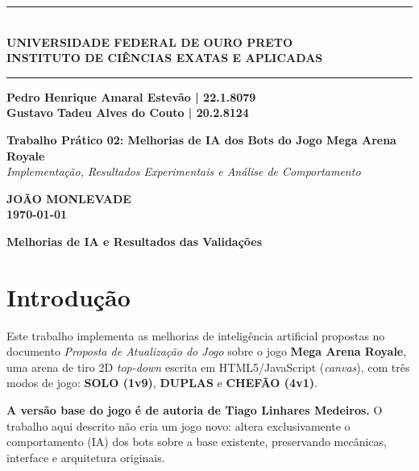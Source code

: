 \documentclass[a4paper,12pt]{article}
\newcommand{\ABNTEXchapterfont}{\bfseries}
\begin{document}
\begin{titlepage}
\begin{center}
    \vspace*{1cm}
    \rule{\textwidth}{0.4pt} \\
    \textbf{UNIVERSIDADE FEDERAL DE OURO PRETO} \\
    \textbf{INSTITUTO DE CIÊNCIAS EXATAS E APLICADAS} \\
    \rule{\textwidth}{0.4pt}

    \vspace{3cm}
    \textbf{Pedro Henrique Amaral Estevão | 22.1.8079} \\
    \textbf{Gustavo Tadeu Alves do Couto | 20.2.8124}

    \vspace{4cm}
    {\Large \textbf{Trabalho Prático 02: Melhorias de IA dos Bots do Jogo Mega Arena Royale}} \\
    \vspace{0.5cm}
    \textit{Implementação, Resultados Experimentais e Análise de Comportamento}

    \vfill
    \textbf{JOÃO MONLEVADE}\\
    \textbf{\today}
\end{center}
\end{titlepage}

\newpage

\clearpage
\thispagestyle{plain}
\begin{center}
  {\ABNTEXchapterfont\LARGE\bfseries Melhorias de IA e Resultados das Validações}
\end{center}

\vspace{1cm}

\section{Introdução}

Este trabalho implementa as melhorias de inteligência artificial propostas no documento
\textit{Proposta de Atualização do Jogo} sobre o jogo \textbf{Mega Arena Royale}, uma arena
de tiro 2D \textit{top-down} escrita em HTML5/JavaScript (\textit{canvas}), com três modos de
jogo: \textbf{SOLO (1v9)}, \textbf{DUPLAS} e \textbf{CHEFÃO (4v1)}.

\textbf{A versão base do jogo é de autoria de Tiago Linhares Medeiros.} O trabalho aqui
descrito não cria um jogo novo: altera exclusivamente o comportamento (IA) dos bots sobre a
base existente, preservando mecânicas, interface e arquitetura originais.
\end{document}
